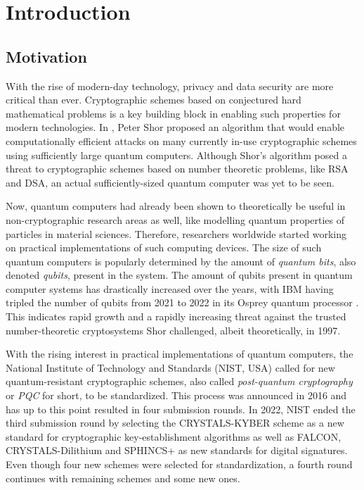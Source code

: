 \section{Introduction} \label{sec:intro}
\subsection{Motivation}
With the rise of modern-day technology, privacy and data security are more critical than ever. Cryptographic schemes based on conjectured hard mathematical problems is a key building block in enabling such properties for modern technologies. In \cite{Shor_1997}, Peter Shor proposed an algorithm that would enable computationally efficient attacks on many currently in-use cryptographic schemes using sufficiently large quantum computers. Although Shor's algorithm posed a threat to cryptographic schemes based on number theoretic problems, like RSA and DSA, an actual sufficiently-sized quantum computer was yet to be seen. 

Now, quantum computers had already been shown to theoretically be useful in non-cryptographic research areas as well, like modelling quantum properties of particles in material sciences. Therefore, researchers worldwide started working on practical implementations of such computing devices. The size of such quantum computers is popularly determined by the amount of \textit{quantum bits}, also denoted \textit{qubits}, present in the system. The amount of qubits present in quantum computer systems has drastically increased over the years, with IBM having tripled the number of qubits from 2021 to 2022 in its Osprey quantum processor \cite{IBM_Osprey}. This indicates rapid growth and a rapidly increasing threat against the trusted number-theoretic cryptosystems Shor challenged, albeit theoretically, in 1997.

With the rising interest in practical implementations of quantum computers, the National Institute of Technology and Standards (NIST, USA) called for new quantum-resistant cryptographic schemes, also called \textit{post-quantum cryptography} or \textit{PQC} for short, to be standardized. This process was announced in 2016 and has up to this point resulted in four submission rounds. In 2022, NIST ended the third submission round by selecting the CRYSTALS-KYBER scheme as a new standard for cryptographic key-establishment algorithms as well as FALCON, CRYSTALS-Dilithium and SPHINCS+ as new standards for digital signatures. Even though four new schemes were selected for standardization, a fourth round continues with remaining schemes and some new ones. 

